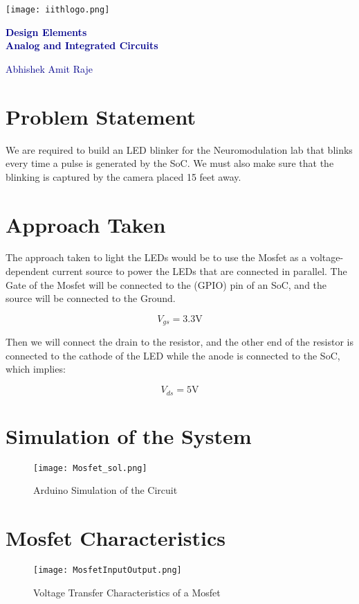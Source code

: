 \documentclass{article}
\renewcommand{\maketitle}{
  \begin{center}
    \texttt{[image: iithlogo.png]} %
    \vspace{1cm}
    
    {\LARGE\bfseries\textcolor{darkblue}{Design Elements }} \\[1ex]
    {\LARGE\bfseries\textcolor{darkblue}{Analog and Integrated Circuits}}
    
    \vspace{1cm}
    
    \large\textcolor{darkblue}{Abhishek Amit Raje} \\
    \thedate
  \end{center}
}
\begin{document}
\begin{titlingpage}
  \maketitle
\end{titlingpage}

\section{Problem Statement}
We are required to build an LED blinker for the Neuromodulation lab that blinks every time a pulse is generated by the SoC. We must also make sure that the blinking is captured by the camera placed 15 feet away.

\section{Approach Taken}
The approach taken to light the LEDs would be to use the Mosfet as a voltage-dependent current source to power the LEDs that are connected in parallel. The Gate of the Mosfet will be connected to the (GPIO) pin of an SoC, and the source will be connected to the Ground.

\begin{equation}
V_{gs} = 3.3\text{V}
\end{equation}

Then we will connect the drain to the resistor, and the other end of the resistor is connected to the cathode of the LED while the anode is connected to the SoC, which implies:

\begin{equation}
V_{ds} = 5\text{V}
\end{equation}

\section{Simulation of the System}
\begin{figure}[h]
  \centering
  \texttt{[image: Mosfet\_sol.png]} %
  \caption{Arduino Simulation of the Circuit}
  \label{fig:arduino_simulation}
\end{figure}

\section{Mosfet Characteristics}
\begin{figure}[h]
  \centering
  \texttt{[image: MosfetInputOutput.png]} %
  \caption{Voltage Transfer Characteristics of a Mosfet}
  \label{fig:mosfet_characteristics}
\end{figure}
\end{document}
